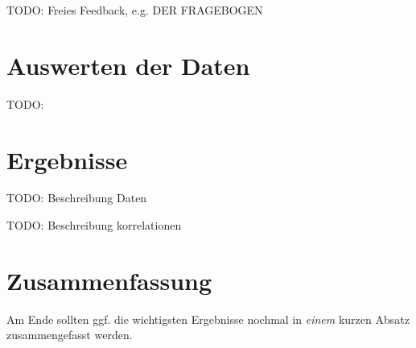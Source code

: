 TODO: Freies Feedback, e.g. DER FRAGEBOGEN

\section{Auswerten der Daten}

TODO: 

\section{Ergebnisse}

TODO: Beschreibung Daten
\par
TODO: Beschreibung korrelationen


\section{Zusammenfassung}
\label{ch:Evaluierung:sec:zusammenfassung}

Am Ende sollten ggf. die wichtigsten Ergebnisse nochmal in \emph{einem}
kurzen Absatz zusammengefasst werden.

